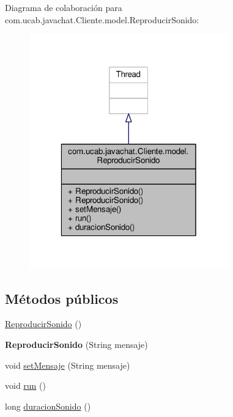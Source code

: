 Diagrama de colaboración para com.\-ucab.\-javachat.\-Cliente.\-model.\-Reproducir\-Sonido\-:
\nopagebreak
\begin{figure}[H]
\begin{center}
\leavevmode
\includegraphics[width=244pt]{d4/d5e/classcom_1_1ucab_1_1javachat_1_1_cliente_1_1model_1_1_reproducir_sonido__coll__graph}
\end{center}
\end{figure}
\subsection*{Métodos públicos}
\begin{DoxyCompactItemize}
\item 
\hyperlink{classcom_1_1ucab_1_1javachat_1_1_cliente_1_1model_1_1_reproducir_sonido_ac10d27e817edf62839046eb5f07aa236}{Reproducir\-Sonido} ()
\item 
\hypertarget{classcom_1_1ucab_1_1javachat_1_1_cliente_1_1model_1_1_reproducir_sonido_aaed28ce271a5d5a7975ef77c8ae26274}{{\bfseries Reproducir\-Sonido} (String mensaje)}\label{classcom_1_1ucab_1_1javachat_1_1_cliente_1_1model_1_1_reproducir_sonido_aaed28ce271a5d5a7975ef77c8ae26274}

\item 
void \hyperlink{classcom_1_1ucab_1_1javachat_1_1_cliente_1_1model_1_1_reproducir_sonido_a00ae7bbb07322bf4d4b578c0d10b34bb}{set\-Mensaje} (String mensaje)
\item 
void \hyperlink{classcom_1_1ucab_1_1javachat_1_1_cliente_1_1model_1_1_reproducir_sonido_ac8f472ebd53121c63b932d0264dfa917}{run} ()
\item 
long \hyperlink{classcom_1_1ucab_1_1javachat_1_1_cliente_1_1model_1_1_reproducir_sonido_aa251ecd4cbf7251b58ec572a5d3f4656}{duracion\-Sonido} ()
\end{DoxyCompactItemize}



